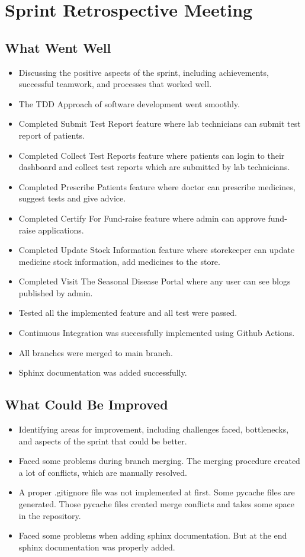 \documentclass[a4paper,12pt]{article}
\begin{document}
\section{Sprint Retrospective Meeting}
\subsection{What Went Well}
\begin{itemize}
    \item Discussing the positive aspects of the sprint, including achievements, successful teamwork, and processes that worked well.

    \item The TDD Approach of software development went smoothly.
    \item Completed Submit Test Report feature where lab technicians can submit test report of patients.
    \item Completed Collect Test Reports feature where patients can login to their dashboard and collect test reports which are submitted by lab technicians.
    \item Completed Prescribe Patients feature where doctor can prescribe medicines, suggest tests and give advice.
    \item Completed Certify For Fund-raise feature where admin can approve fund-raise applications.
    \item Completed Update Stock Information feature where storekeeper can update medicine stock information, add medicines to the store.
    \item Completed Visit The Seasonal Disease Portal where any user can see blogs published by admin.
    \item Tested all the implemented feature and all test were passed.
    \item Continuous Integration was successfully implemented using Github Actions.
    \item All branches were merged to main branch.
    \item Sphinx documentation was added successfully.
\end{itemize}
\subsection{What Could Be Improved}
\begin{itemize}
    \item Identifying areas for improvement, including challenges faced, bottlenecks, and aspects of the sprint that could be better.

    \item Faced some problems during branch merging. The merging procedure created a lot of conflicts, which are manually resolved.
    \item A proper .gitignore file was not implemented at first. Some pycache files are generated. Those pycache files created merge conflicts and takes some space in the repository.
    \item Faced some problems when adding sphinx documentation. But at the end sphinx documentation was properly added.
\end{itemize}
\end{document}
